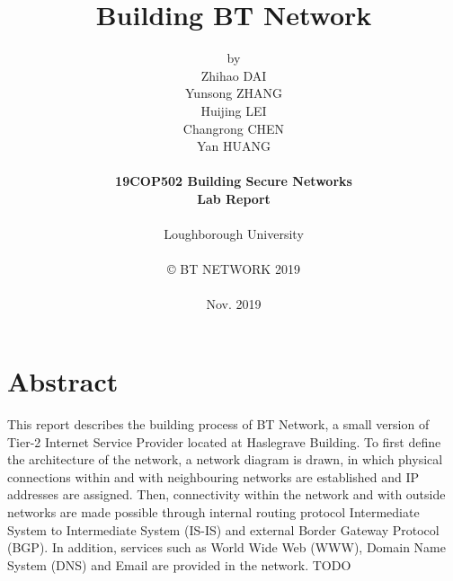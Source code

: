 \title{\bf Building BT Network}

\author{by\\
Zhihao DAI\\
Yunsong ZHANG\\
Huijing LEI\\
Changrong CHEN\\
Yan HUANG\\
\\
{\bf 19COP502 Building Secure Networks}\\
{\bf Lab Report}\\
\\
Loughborough University\\
\\
\copyright
\hspace{1 dd} BT NETWORK 2019\\
\\
Nov. 2019
}
\date{} %

\maketitle


% 
% 

\chapter*{Abstract}
This report describes the building process of BT Network, a small version of Tier-2 Internet Service Provider located at Haslegrave Building.
To first define the architecture of the network, a network diagram is drawn, in which physical connections within and with neighbouring networks are established and IP addresses are assigned. 
Then, connectivity within the network and with outside networks are made possible through internal routing protocol Intermediate System to Intermediate System (IS-IS) and external Border Gateway Protocol (BGP).
In addition, services such as World Wide Web (WWW), Domain Name System (DNS) and Email are provided in the network.
TODO


